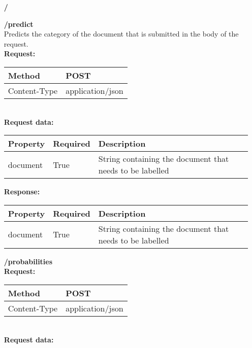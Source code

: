 \begin{enumerate}
\item[\textbf{/}]\\
\item[\textbf{/predict}]\\


Predicts the category of the document that is submitted in the body of the request.\\

\textbf{Request:}\\


\begin{tabular}{ | l | l |}
\hline
Method & POST\\ \hline
Content-Type & application/json\\ \hline
\end{tabular}
\\


\textbf{Request data:}\\

\begin{tabular}{ | l | l | l |}
\hline
Property & Required & Description\\ \hline
document & True & String containing the document that needs to be labelled\\ \hline
\end{tabular}

\textbf{Response:}
\newline
\newline
\begin{tabular}{ | l | l | l |}
\hline
Property & Required & Description\\ \hline
document & True & String containing the document that needs to be labelled\\ \hline
\end{tabular}

\item[\textbf{/probabilities}]\\

\textbf{Request:}\\


\begin{tabular}{ | l | l |}
\hline
Method & POST\\ \hline
Content-Type & application/json\\ \hline
\end{tabular}
\\


\textbf{Request data:}\\


\end{enumerate}
